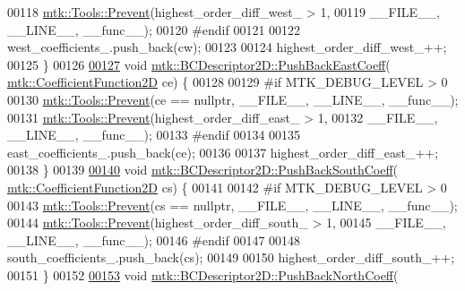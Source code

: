 \begin{DoxyCode}
00118   \hyperlink{classmtk_1_1Tools_a332324c6f25e66be9dff48c5987a3b9f}{mtk::Tools::Prevent}(highest\_order\_diff\_west\_ > 1,
00119                       \_\_FILE\_\_, \_\_LINE\_\_, \_\_func\_\_);
00120 \textcolor{preprocessor}{  #endif}
00121 
00122   west\_coefficients\_.push\_back(cw);
00123 
00124   highest\_order\_diff\_west\_++;
00125 \}
00126 
\hypertarget{mtk__bc__descriptor__2d_8cc_source_l00127}{}\hyperlink{classmtk_1_1BCDescriptor2D_a27635428a6c36d1e305cafdc68271063}{00127} \textcolor{keywordtype}{void} \hyperlink{classmtk_1_1BCDescriptor2D_a27635428a6c36d1e305cafdc68271063}{mtk::BCDescriptor2D::PushBackEastCoeff}(
      \hyperlink{group__c07-mim__ops_gad9e1c0ace886b0029aefffa5f320e852}{mtk::CoefficientFunction2D} ce) \{
00128 
00129 \textcolor{preprocessor}{  #if MTK\_DEBUG\_LEVEL > 0}
00130   \hyperlink{classmtk_1_1Tools_a332324c6f25e66be9dff48c5987a3b9f}{mtk::Tools::Prevent}(ce == \textcolor{keyword}{nullptr}, \_\_FILE\_\_, \_\_LINE\_\_, \_\_func\_\_);
00131   \hyperlink{classmtk_1_1Tools_a332324c6f25e66be9dff48c5987a3b9f}{mtk::Tools::Prevent}(highest\_order\_diff\_east\_ > 1,
00132                       \_\_FILE\_\_, \_\_LINE\_\_, \_\_func\_\_);
00133 \textcolor{preprocessor}{  #endif}
00134 
00135   east\_coefficients\_.push\_back(ce);
00136 
00137   highest\_order\_diff\_east\_++;
00138 \}
00139 
\hypertarget{mtk__bc__descriptor__2d_8cc_source_l00140}{}\hyperlink{classmtk_1_1BCDescriptor2D_a9eb891f14c68968a0113632fa5fea630}{00140} \textcolor{keywordtype}{void} \hyperlink{classmtk_1_1BCDescriptor2D_a9eb891f14c68968a0113632fa5fea630}{mtk::BCDescriptor2D::PushBackSouthCoeff}(
      \hyperlink{group__c07-mim__ops_gad9e1c0ace886b0029aefffa5f320e852}{mtk::CoefficientFunction2D} cs) \{
00141 
00142 \textcolor{preprocessor}{  #if MTK\_DEBUG\_LEVEL > 0}
00143   \hyperlink{classmtk_1_1Tools_a332324c6f25e66be9dff48c5987a3b9f}{mtk::Tools::Prevent}(cs == \textcolor{keyword}{nullptr}, \_\_FILE\_\_, \_\_LINE\_\_, \_\_func\_\_);
00144   \hyperlink{classmtk_1_1Tools_a332324c6f25e66be9dff48c5987a3b9f}{mtk::Tools::Prevent}(highest\_order\_diff\_south\_ > 1,
00145                       \_\_FILE\_\_, \_\_LINE\_\_, \_\_func\_\_);
00146 \textcolor{preprocessor}{  #endif}
00147 
00148   south\_coefficients\_.push\_back(cs);
00149 
00150   highest\_order\_diff\_south\_++;
00151 \}
00152 
\hypertarget{mtk__bc__descriptor__2d_8cc_source_l00153}{}\hyperlink{classmtk_1_1BCDescriptor2D_a0fed58bd058d699a572888fe4b9934a4}{00153} \textcolor{keywordtype}{void} \hyperlink{classmtk_1_1BCDescriptor2D_a0fed58bd058d699a572888fe4b9934a4}{mtk::BCDescriptor2D::PushBackNorthCoeff}(

\end{DoxyCode}
